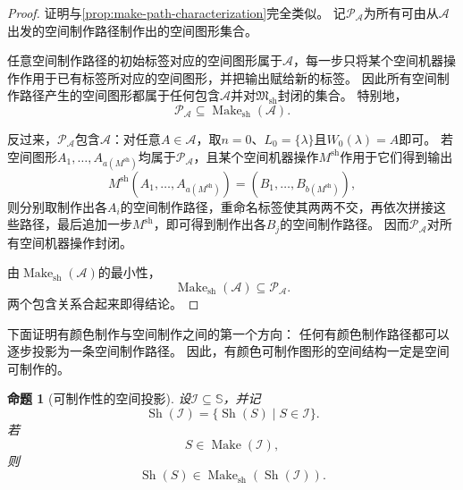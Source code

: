 \documentclass[UTF8,fontset=none]{ctexart}
\theoremstyle{cnthm}
\newtheorem{proposition}{命题}[section]
\begin{document}
			\begin{proof}
				证明与\cref{prop:make-path-characterization}完全类似。
				记$\mathcal{P}_{\mathcal{A}}$为所有可由从$\mathcal{A}$出发的空间制作路径制作出的空间图形集合。
				
				任意空间制作路径的初始标签对应的空间图形属于$\mathcal{A}$，每一步只将某个空间机器操作作用于已有标签所对应的空间图形，并把输出赋给新的标签。
				因此所有空间制作路径产生的空间图形都属于任何包含$\mathcal{A}$并对$\mathfrak{M}_{\mathrm{sh}}$封闭的集合。
				特别地，
				$$
				\mathcal{P}_{\mathcal{A}}
				\subseteq
				\operatorname{Make}_{\mathrm{sh}}(\mathcal{A}).
				$$
				
				反过来，$\mathcal{P}_{\mathcal{A}}$包含$\mathcal{A}$：对任意$A\in\mathcal{A}$，取$n=0$、$L_0=\{\lambda\}$且$W_0(\lambda)=A$即可。
				若空间图形$A_1,\dots,A_{a(M^{\mathrm{sh}})}$均属于$\mathcal{P}_{\mathcal{A}}$，且某个空间机器操作$M^{\mathrm{sh}}$作用于它们得到输出
				$$
				M^{\mathrm{sh}}(A_1,\dots,A_{a(M^{\mathrm{sh}})})
				=
				(B_1,\dots,B_{b(M^{\mathrm{sh}})}),
				$$
				则分别取制作出各$A_i$的空间制作路径，重命名标签使其两两不交，再依次拼接这些路径，最后追加一步$M^{\mathrm{sh}}$，即可得到制作出各$B_j$的空间制作路径。
				因而$\mathcal{P}_{\mathcal{A}}$对所有空间机器操作封闭。
				
				由$\operatorname{Make}_{\mathrm{sh}}(\mathcal{A})$的最小性，
				$$
				\operatorname{Make}_{\mathrm{sh}}(\mathcal{A})
				\subseteq
				\mathcal{P}_{\mathcal{A}}.
				$$
				两个包含关系合起来即得结论。
			\end{proof}
			
			下面证明有颜色制作与空间制作之间的第一个方向：
			任何有颜色制作路径都可以逐步投影为一条空间制作路径。
			因此，有颜色可制作图形的空间结构一定是空间可制作的。
			
			\begin{proposition}[可制作性的空间投影]\label{prop:make-shape-projection}
				设$\mathcal{I}\subseteq\mathbb{S}$，并记
				$$
				\operatorname{Sh}(\mathcal{I})
				=
				\{\operatorname{Sh}(S)\mid S\in\mathcal{I}\}.
				$$
				若
				$$
				S\in\operatorname{Make}(\mathcal{I}),
				$$
				则
				$$
				\operatorname{Sh}(S)
				\in
				\operatorname{Make}_{\mathrm{sh}}(\operatorname{Sh}(\mathcal{I})).
				$$
			\end{proposition}
			
\end{document}
